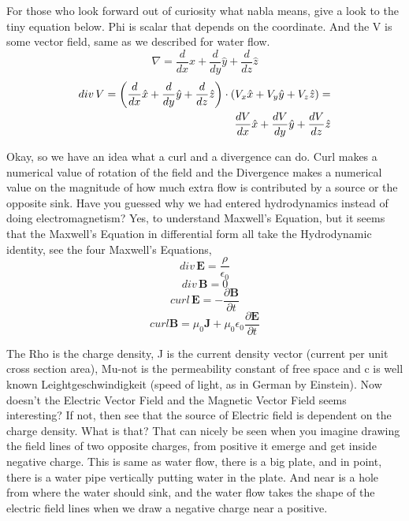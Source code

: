 \documentclass[11pt,a4paper,twocolumn,openright]{article}
\renewcommand{\vec}[1]{\boldsymbol{#1}}
\theoremstyle{definition}
\theoremstyle{definition}
\theoremstyle{definition}
\theoremstyle{definition}
\begin{document}
For those who look forward out of curiosity what nabla means, give a look to the tiny equation below. Phi is scalar that depends on the coordinate. And the V is some vector field, same as we described for water flow.
	\begin{equation}
	\nabla =
	 	\frac{d}{dx} \hat{x}+ \frac{d}{dy} \hat{y} + \frac{d}{dz} \hat{z} 
	\end{equation}
	\begin{align}
	div \, V =
	\left(\frac{d}{dx} \hat{x}+ \frac{d}{dy} \hat{y} + \frac{d}{dz} \hat{z}\right) \cdot
	(V_x \hat{x} + V_y \hat{y} + V_z \hat{z}) = \notag \\ 
	\frac{dV}{dx} \hat{x} + \frac{dV}{dy} \hat{y} + \frac{dV}{dz} \hat{z}
	\end{align}


Okay, so we have an idea what a curl and a divergence can do. Curl makes a numerical value of rotation of the field and the Divergence makes a numerical value on the magnitude of how much extra flow is contributed by a source or the opposite sink. Have you guessed why we had entered hydrodynamics instead of doing electromagnetism? Yes, to understand Maxwell's Equation, but it seems that the Maxwell's Equation in differential form all take the Hydrodynamic identity, see the four Maxwell's Equations,
	\begin{equation}
	div \, \vec{E} = \frac{\rho}{\epsilon_0}
	\end{equation}
	\begin{equation}
	div \, \vec{B} = 0
	\end{equation}
	\begin{equation}
	curl \, \vec{E} = - \frac{\partial \vec{B}}{\partial t}
	\end{equation}
	\begin{equation}
	curl \vec{B} = \mu_0 \vec{J} + \mu_0 \epsilon_0 \frac{\partial \vec{E}}{\partial t}
	\end{equation}
	

The Rho is the charge density, J is the current density vector (current per unit cross section area), Mu-not is the permeability constant of free space and c is well known Leightgeschwindigkeit (speed of light, as in German by Einstein). Now doesn't the Electric Vector Field and the Magnetic Vector Field seems interesting? If not, then see that the source of Electric field is dependent on the charge density. What is that? That can nicely be seen when you imagine drawing the field lines of two opposite charges, from positive it emerge and get inside negative charge. This is same as water flow, there is a big plate, and in point, there is a water pipe vertically putting water in the plate. And near is a hole from where the water should sink, and the water flow takes the shape of the electric field lines when we draw a negative charge near a positive. 
\end{document}
